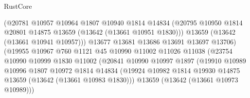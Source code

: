 \begin{lexlean}{RustCore}
\begin{coremodule}
                                    (@20781
                                      @10957
                                      @10964
                                      @1807
                                      @10940
                                      @1814
                                      @14834
                                      (@20795
                                        @10950
                                        @1814
                                        @20801
                                        @14875
                                        @13659
                                        (@13642 (@13661 @10951 @1830)))
                                      @13659
                                      (@13642 (@13661 @10941 @10957)))
                                    @13677
                                    @13681
                                    @13686
                                    @13691
                                    @13697
                                    @13706)
                                  (@19955
                                    @10967
                                    @760
                                    @1121
                                    @45
                                    @10990
                                    @11002
                                    @11026
                                    @11038
                                    (@23754
                                      @10990
                                      @10999
                                      @1830
                                      @11002
                                      (@20841
                                        @10990
                                        @10997
                                        @1897
                                        (@19910
                                          @10989
                                          @10996
                                          @1807
                                          @10972
                                          @1814
                                          @14834
                                          (@19924
                                            @10982
                                            @1814
                                            @19930
                                            @14875
                                            @13659
                                            (@13642 (@13661 @10983 @1830)))
                                          @13659
                                          (@13642 (@13661 @10973 @10989)))

\end{coremodule}
\end{lexlean}

